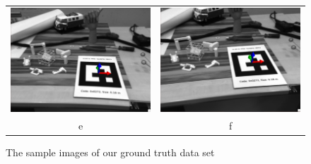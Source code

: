 \begin{figure}[H]
\begin{tabular}{cc}
  \includegraphics[width=65mm]{figures/sample_4} &   \includegraphics[width=65mm]{figures/sample_5} \\
  e & f \\[6pt]
\end{tabular}
\caption{The sample images of our ground truth data set}\label{fig:sample_dataset_marker}
\end{figure}

